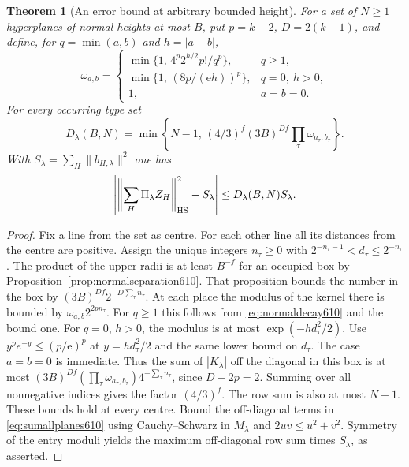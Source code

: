 \documentclass[a4paper,11pt]{article}
\newtheorem{theorem}[proposition]{Theorem}
\theoremstyle{definition}
\theoremstyle{remark}
\numberwithin{equation}{section}
\begin{document}
\begin{theorem}[An error bound at arbitrary bounded height]
\leavevmode\label{thm:angularerror610}
For a set of \(N\ge1\) hyperplanes of normal heights at most \(B\),
put \(p=k-2\), \(D=2(k-1)\), and define, for \(q=\min(a,b)\)
and \(h=|a-b|\),
\[
 \omega_{a,b}=
 \begin{cases}
  \min\{1,\,4^p2^{h/2}p!/q^p\},&q\ge1,\\
  \min\{1,\,(8p/(\mathrm e h))^p\},&q=0,\ h>0,\\
  1,&a=b=0 .
 \end{cases}
\]
For every occurring type set
\[
   D_\lambda(B,N)=\min\left\{N-1,\,
     (4/3)^f(3B)^{Df}\prod_\tau\omega_{a_\tau,b_\tau}\right\}.
\]
With \(S_\lambda=\sum_H\|b_{H,\lambda}\|^2\) one has
\[
 \left|\left\|\sum_H\Pi_\lambda Z_H\right\|_{\rm HS}^2-S_\lambda\right|
              \le D_\lambda(B,N)S_\lambda .
\]
\end{theorem}
\begin{proof}
Fix a line from the set as centre. For each other line all its
distances from the centre are positive. Assign the unique
integers \(n_\tau\ge0\) with
\(2^{-n_\tau-1}<d_\tau\le2^{-n_\tau}\).
The product of the upper radii is at least \(B^{-f}\) for an
occupied box by Proposition~\ref{prop:normalseparation610}.
That proposition bounds the number in the box by
\((3B)^{Df}2^{-D\sum_\tau n_\tau}\).
At each place the modulus of the kernel there is bounded by
\(\omega_{a,b}2^{2p n_\tau}\). For \(q\ge1\) this follows
from \eqref{eq:normaldecay610} and the bound one. For \(q=0\),
\(h>0\), the modulus is at most \(\exp(-h d_\tau^2/2)\).
Use \(y^p e^{-y}\le(p/\mathrm e)^p\) at \(y=h d_\tau^2/2\)
and the same lower bound on \(d_\tau\). The case \(a=b=0\)
is immediate. Thus the sum of \(|K_\lambda|\) off the diagonal
in this box is at most
\((3B)^{Df}(\prod_\tau\omega_{a_\tau,b_\tau})4^{-\sum_\tau n_\tau}\),
since \(D-2p=2\). Summing over all nonnegative indices gives
the factor \((4/3)^f\). The row sum is also at most \(N-1\).
These bounds hold at every centre. Bound the off-diagonal terms
in \eqref{eq:sumallplanes610} using Cauchy--Schwarz in
\(M_\lambda\) and \(2uv\le u^2+v^2\). Symmetry of the entry
moduli yields the maximum off-diagonal row sum times \(S_\lambda\),
as asserted.
\end{proof}
\end{document}

